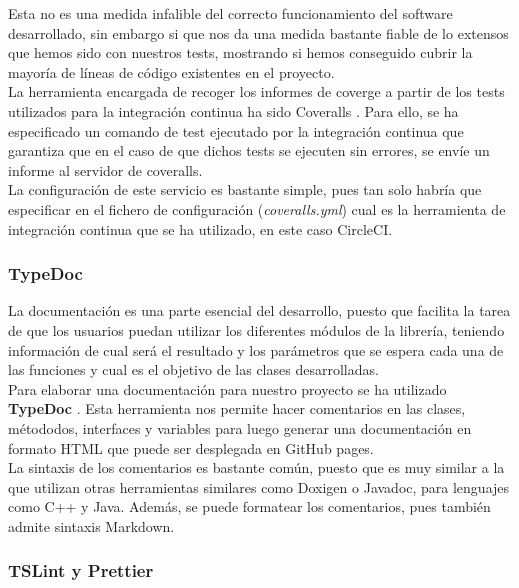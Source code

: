  Esta no es una medida infalible del correcto funcionamiento del software desarrollado, sin embargo si que nos da una medida bastante fiable de lo extensos que hemos sido con nuestros tests, mostrando si hemos conseguido cubrir la mayoría de líneas de código existentes en el proyecto.\\
 
 La herramienta encargada de recoger los informes de coverge a partir de los tests utilizados para la integración continua ha sido Coveralls \cite{coveralls}. Para ello, se ha especificado un comando de test ejecutado por la integración continua que garantiza que en el caso de que dichos tests se ejecuten sin errores, se envíe un informe al servidor de coveralls. \\
 
 La configuración de este servicio es bastante simple, pues tan solo habría que especificar en el fichero de configuración (\textit{coveralls.yml}) cual es la herramienta de integración continua que se ha utilizado, en este caso CircleCI.
 
 \subsubsection{TypeDoc}
 
 La documentación es una parte esencial del desarrollo, puesto que facilita la tarea de que los usuarios puedan utilizar los diferentes módulos de la librería, teniendo información de cual será el resultado y los parámetros que se espera cada una de las funciones y cual es el objetivo de las clases desarrolladas. \\
 
 Para elaborar una documentación para nuestro proyecto se ha utilizado \textbf{TypeDoc} \cite{typedoc}. Esta herramienta nos permite hacer comentarios en las clases, métododos, interfaces y variables para luego generar una documentación en formato HTML que puede ser desplegada en GitHub pages. \\
 
 La sintaxis de los comentarios es bastante común, puesto que es muy similar a la que utilizan otras herramientas similares como Doxigen o Javadoc, para lenguajes como C++ y Java. Además, se puede formatear los comentarios, pues también admite sintaxis Markdown.
 
 \subsubsection{TSLint y Prettier}
 
